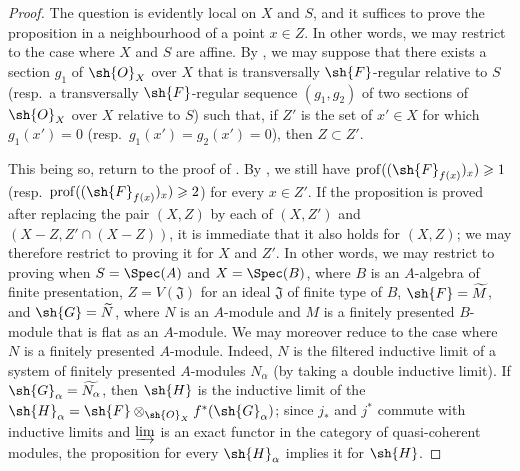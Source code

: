 \begin{proof}
The question is evidently local on $X$ and $S$, and it suffices to prove the proposition in a neighbourhood of a point $x\in Z$. In other words, we may restrict to the case where $X$ and $S$ are affine. By , we may suppose that there exists a section $g_1$ of $\sh{O}_X$ over $X$ that is transversally $\sh{F}$-regular relative to $S$ (resp.\ a transversally $\sh{F}$-regular sequence $(g_1,g_2)$ of two sections of $\sh{O}_X$ over $X$ relative to $S$) such that, if $Z'$ is the set of $x'\in X$ for which $g_1(x')=0$ (resp.\ $g_1(x')=g_2(x')=0$), then $Z\subset Z'$.

This being so, return to the proof of . By , we still have $\operatorname{prof}((\sh{F}_{f(x)})_x)\geqslant 1$ (resp.\ $\operatorname{prof}((\sh{F}_{f(x)})_x)\geqslant 2$) for every $x\in Z'$. If the proposition is proved after replacing the pair $(X,Z)$ by each of $(X,Z')$ and $(X-Z,Z'\cap(X-Z))$, it is immediate that it also holds for $(X,Z)$; we may therefore restrict to proving it for $X$ and $Z'$. In other words, we may restrict to proving  when $S=\Spec(A)$ and $X=\Spec(B)$, where $B$ is an $A$-algebra of finite presentation, $Z=V(\mathfrak{J})$ for an ideal $\mathfrak{J}$ of finite type of $B$, $\sh{F}=\widetilde M$, and $\sh{G}=\widetilde N$, where $N$ is an $A$-module and $M$ is a finitely presented $B$-module that is flat as an $A$-module. We may moreover reduce to the case where $N$ is a finitely presented $A$-module. Indeed, $N$ is the filtered inductive limit of a system of finitely presented $A$-modules $N_\alpha$ (by taking a double inductive limit). If $\sh{G}_\alpha=\widetilde{N_\alpha}$, then $\sh{H}$ is the inductive limit of the $\sh{H}_\alpha=\sh{F}\otimes_{\sh{O}_X}f^*(\sh{G}_\alpha)$; since $j_*$ and $j^*$ commute with inductive limits and $\varinjlim$ is an exact functor in the category of quasi-coherent modules, the proposition for every $\sh{H}_\alpha$ implies it for $\sh{H}$.


\end{proof}
